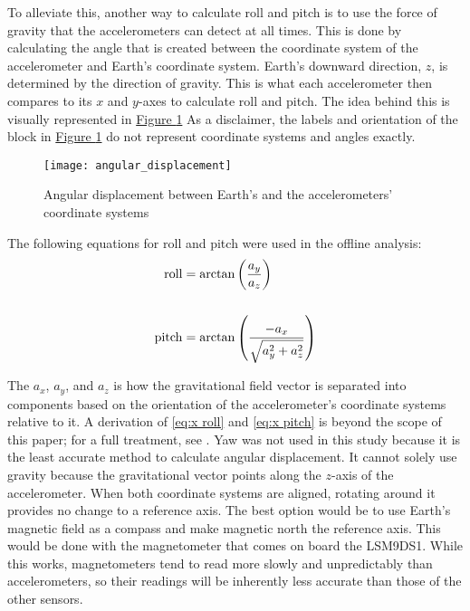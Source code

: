 To alleviate this, another way to calculate roll and pitch is to use the force of gravity that the accelerometers can detect at all times.
This is done by calculating the angle that is created between the coordinate system of the accelerometer and Earth’s coordinate system.
Earth’s downward direction, $z$, is determined by the direction of gravity.
This is what each accelerometer then compares to its $x$ and $y$-axes to calculate roll and pitch.
The idea behind this is visually represented in \hyperref[{fig:x angular displacement}]{Figure \ref*{fig:x angular displacement}}
As a disclaimer, the labels and orientation of the block in \hyperref[{fig:x angular displacement}]{Figure \ref*{fig:x angular displacement}} do not represent coordinate systems and angles exactly.\par

\begin{figure}[h]
  \centering
  \texttt{[image: angular\_displacement]}
  \caption[Angular displacement]{Angular displacement between Earth’s and the accelerometers' coordinate systems \parencite{newton}}
  \label{fig:x angular displacement}
\end{figure}

The following equations for roll and pitch were used in the offline analysis:
\begin{align}
  \mathrm{roll} &= \arctan\left( \frac{a_y}{a_z} \right)\label{eq:x roll}\\
  \hfill\nonumber\\
  \mathrm{pitch} &= \arctan\left( \frac{-a_x}{\sqrt{a_y^2+a_z^2}} \right)\label{eq:x pitch}
\end{align}

The $a_x$, $a_y$, and $a_z$ is how the gravitational field vector is separated into components based on the orientation of the accelerometer's coordinate systems relative to it.
A derivation of \ref{eq:x roll} and \ref{eq:x pitch} is beyond the scope of this paper;
for a full treatment, see \cite{pedley}.
Yaw was not used in this study because it is the least accurate method to calculate angular displacement.
It cannot solely use gravity because the gravitational vector points along the $z$-axis of the accelerometer.
When both coordinate systems are aligned, rotating around it provides no change to a reference axis.
The best option would be to use Earth’s magnetic field as a compass and make magnetic north the reference axis.
This would be done with the magnetometer that comes on board the LSM9DS1.
While this works, magnetometers tend to read more slowly and unpredictably than accelerometers, so their readings will be inherently less accurate than those of the other sensors.\par

